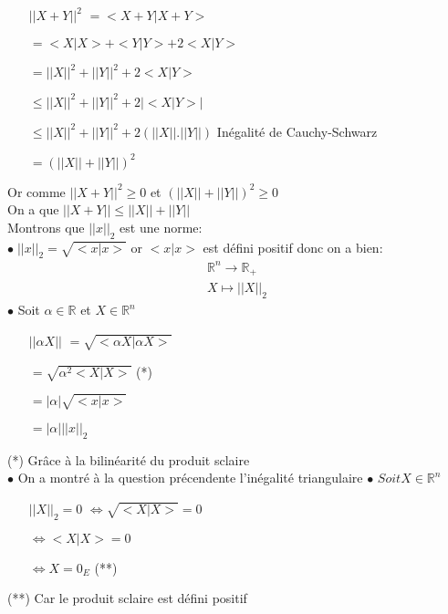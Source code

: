\documentclass{article}
\begin{document}
\begin{itemize}
    \item[$||X + Y||^2$] $=<X + Y | X + Y>$
    \item[] $=<X | X> + <Y | Y> + 2 <X | Y>$
    \item[] $= ||X||^2 + ||Y||^2 + 2 <X | Y>$
    \item[] $\leq ||X||^2 + ||Y||^2 + 2 |<X | Y>|$
    \item[] $\leq  ||X||^2 + ||Y||^2 + 2 (||X|| . ||Y||)$ Inégalité de Cauchy-Schwarz
    \item[] $=(||X|| + ||Y||)^2$ 
\end{itemize}
Or comme $||X + Y||^2 \geq 0$ et $(||X|| + ||Y||)^2 \geq 0$\\
On a que $||X + Y|| \leq ||X|| + ||Y||$\\
Montrons que $||x||_2$ est une norme:\\
$\bullet \; ||x||_2 = \sqrt{<x|x>}$ or $<x|x>$ est défini positif donc on a bien:
\begin{align*}
    \mathbb{R}^n \rightarrow \mathbb{R}_+\\
    X \longmapsto ||X||_2
\end{align*}
$\bullet$ Soit $\alpha \in \mathbb{R}$ et $X \in \mathbb{R}^n$
\begin{center}
    \begin{minipage}{0.50\textwidth}    
        \begin{itemize}
            \item[$||\alpha X||$] $= \sqrt{<\alpha X | \alpha X>}$
            \item[] $= \sqrt{\alpha^2 <X | X>}$ (*)
            \item[] $= |\alpha| \sqrt{<x|x>}$
            \item[] $= |\alpha| ||x||_2$   
        \end{itemize}
    \end{minipage}
\end{center}
(*) Grâce à la bilinéarité du produit sclaire\\
$\bullet$ On a montré à la question précendente l'inégalité triangulaire
$\bullet$ $Soit X \in \mathbb{R}^n$
\begin{center}
    \begin{minipage}{0.50\textwidth}    
        \begin{itemize}
            \item[$||X||_2 = 0$] $\Leftrightarrow \sqrt{<X|X>} = 0$
            \item[] $\Leftrightarrow <X|X> = 0$
            \item[] $\Leftrightarrow X = 0_E$ (**)          
        \end{itemize}
    \end{minipage}
\end{center}
(**) Car le produit sclaire est défini positif
\end{document}
